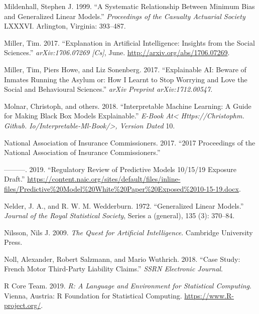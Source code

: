 \documentclass[preprint, 3p, twocolumn, letterpaper, 10pt]{elsarticle} %
\begin{document}
\leavevmode\hypertarget{ref-mildenhall_1999}{}%
Mildenhall, Stephen J. 1999. ``A Systematic Relationship Between Minimum Bias and Generalized Linear Models.'' \emph{Proceedings of the Casualty Actuarial Society} LXXXVI. Arlington, Virginia: 393--487.

\leavevmode\hypertarget{ref-millerExplanationArtificial2017}{}%
Miller, Tim. 2017. ``Explanation in Artificial Intelligence: Insights from the Social Sciences.'' \emph{arXiv:1706.07269 {[}Cs{]}}, June. \url{http://arxiv.org/abs/1706.07269}.

\leavevmode\hypertarget{ref-millerExplainableAI2017}{}%
Miller, Tim, Piers Howe, and Liz Sonenberg. 2017. ``Explainable AI: Beware of Inmates Running the Asylum or: How I Learnt to Stop Worrying and Love the Social and Behavioural Sciences.'' \emph{arXiv Preprint arXiv:1712.00547}.

\leavevmode\hypertarget{ref-molnar2018interpretable}{}%
Molnar, Christoph, and others. 2018. ``Interpretable Machine Learning: A Guide for Making Black Box Models Explainable.'' \emph{E-Book At\textless{} Https://Christophm. Github. Io/Interpretable-Ml-Book/\textgreater{}, Version Dated} 10.

\leavevmode\hypertarget{ref-naic_summer_2017}{}%
National Association of Insurance Commissioners. 2017. ``2017 Proceedings of the National Association of Insurance Commissioners.''

\leavevmode\hypertarget{ref-naic_white_paper}{}%
---------. 2019. ``Regulatory Review of Predictive Models 10/15/19 Exposure Draft.'' \url{https://content.naic.org/sites/default/files/inline-files/Predictive\%20Model\%20White\%20Paper\%20Exposed\%2010-15-19.docx}.

\leavevmode\hypertarget{ref-nelder_wedderburn_1972}{}%
Nelder, J. A., and R. W. M. Wedderburn. 1972. ``Generalized Linear Models.'' \emph{Journal of the Royal Statistical Society}, Series a (general), 135 (3): 370--84.

\leavevmode\hypertarget{ref-nilsson_2009}{}%
Nilsson, Nils J. 2009. \emph{The Quest for Artificial Intelligence}. Cambridge University Press.

\leavevmode\hypertarget{ref-noll_2018}{}%
Noll, Alexander, Robert Salzmann, and Mario Wuthrich. 2018. ``Case Study: French Motor Third-Party Liability Claims.'' \emph{SSRN Electronic Journal}.

\leavevmode\hypertarget{ref-rlang}{}%
R Core Team. 2019. \emph{R: A Language and Environment for Statistical Computing}. Vienna, Austria: R Foundation for Statistical Computing. \url{https://www.R-project.org/}.
\end{document}
